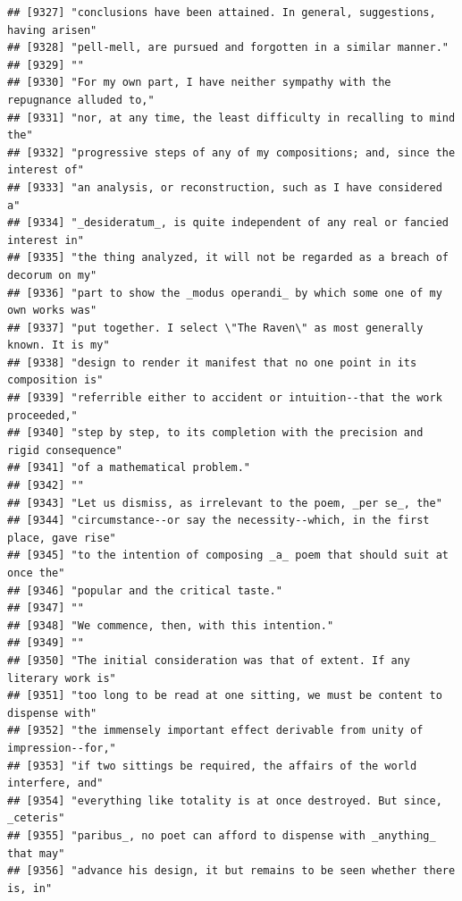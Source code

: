 \documentclass{article}\usepackage[]{graphicx}\usepackage[]{color}
\makeatletter
\newenvironment{kframe}{%
 \def\at@end@of@kframe{}%
 \ifinner\ifhmode%
  \def\at@end@of@kframe{\end{minipage}}%
  \begin{minipage}{\columnwidth}%
 \fi\fi%
 \def\FrameCommand##1{\hskip\@totalleftmargin \hskip-\fboxsep
 \colorbox{shadecolor}{##1}\hskip-\fboxsep
     \hskip-\linewidth \hskip-\@totalleftmargin \hskip\columnwidth}%
 \MakeFramed {\advance\hsize-\width
   \@totalleftmargin\z@ \linewidth\hsize
   \@setminipage}}%
 {\par\unskip\endMakeFramed%
 \at@end@of@kframe}
\newenvironment{knitrout}{}{} %
\makeatother
\begin{document}
\begin{knitrout}
\begin{kframe}
\begin{verbatim}
## [9327] "conclusions have been attained. In general, suggestions, having arisen"      
## [9328] "pell-mell, are pursued and forgotten in a similar manner."                   
## [9329] ""                                                                            
## [9330] "For my own part, I have neither sympathy with the repugnance alluded to,"    
## [9331] "nor, at any time, the least difficulty in recalling to mind the"             
## [9332] "progressive steps of any of my compositions; and, since the interest of"     
## [9333] "an analysis, or reconstruction, such as I have considered a"                 
## [9334] "_desideratum_, is quite independent of any real or fancied interest in"      
## [9335] "the thing analyzed, it will not be regarded as a breach of decorum on my"    
## [9336] "part to show the _modus operandi_ by which some one of my own works was"     
## [9337] "put together. I select \"The Raven\" as most generally known. It is my"      
## [9338] "design to render it manifest that no one point in its composition is"        
## [9339] "referrible either to accident or intuition--that the work proceeded,"        
## [9340] "step by step, to its completion with the precision and rigid consequence"    
## [9341] "of a mathematical problem."                                                  
## [9342] ""                                                                            
## [9343] "Let us dismiss, as irrelevant to the poem, _per se_, the"                    
## [9344] "circumstance--or say the necessity--which, in the first place, gave rise"    
## [9345] "to the intention of composing _a_ poem that should suit at once the"         
## [9346] "popular and the critical taste."                                             
## [9347] ""                                                                            
## [9348] "We commence, then, with this intention."                                     
## [9349] ""                                                                            
## [9350] "The initial consideration was that of extent. If any literary work is"       
## [9351] "too long to be read at one sitting, we must be content to dispense with"     
## [9352] "the immensely important effect derivable from unity of impression--for,"     
## [9353] "if two sittings be required, the affairs of the world interfere, and"        
## [9354] "everything like totality is at once destroyed. But since, _ceteris"          
## [9355] "paribus_, no poet can afford to dispense with _anything_ that may"           
## [9356] "advance his design, it but remains to be seen whether there is, in"          

\end{verbatim}
\end{kframe}
\end{knitrout}
\end{document}
